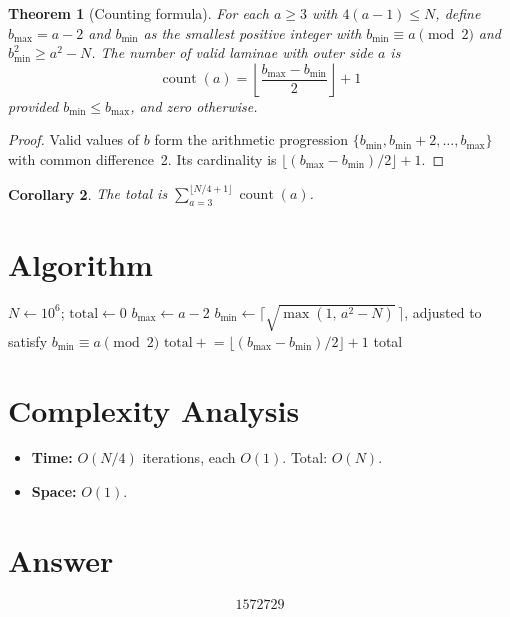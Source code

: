 \documentclass[11pt]{article}
\newtheorem{theorem}{Theorem}
\newtheorem{corollary}[theorem]{Corollary}
\begin{document}
\begin{theorem}[Counting formula]
For each $a \geq 3$ with $4(a{-}1) \leq N$, define $b_{\max} = a - 2$ and $b_{\min}$ as the smallest positive integer with $b_{\min} \equiv a \pmod{2}$ and $b_{\min}^2 \geq a^2 - N$. The number of valid laminae with outer side $a$ is
\[
\operatorname{count}(a) = \left\lfloor\frac{b_{\max} - b_{\min}}{2}\right\rfloor + 1
\]
provided $b_{\min} \leq b_{\max}$, and zero otherwise.
\end{theorem}

\begin{proof}
Valid values of $b$ form the arithmetic progression $\{b_{\min}, b_{\min}{+}2, \ldots, b_{\max}\}$ with common difference~2. Its cardinality is $\lfloor(b_{\max} - b_{\min})/2\rfloor + 1$.
\end{proof}

\begin{corollary}
The total is $\sum_{a=3}^{\lfloor N/4+1\rfloor}\operatorname{count}(a)$.
\end{corollary}

\section{Algorithm}

\begin{algorithmic}[1]
\State $N \gets 10^6$;\; $\text{total} \gets 0$
    \State $b_{\max} \gets a - 2$
    \State $b_{\min} \gets \lceil\sqrt{\max(1,\, a^2 - N)}\,\rceil$, adjusted to satisfy $b_{\min} \equiv a \pmod{2}$
        \State $\text{total} \mathrel{+}= \lfloor(b_{\max} - b_{\min})/2\rfloor + 1$
    \EndIf
\EndFor
\State \Return total
\end{algorithmic}

\section{Complexity Analysis}

\begin{itemize}
    \item \textbf{Time:} $O(N/4)$ iterations, each $O(1)$. Total: $O(N)$.
    \item \textbf{Space:} $O(1)$.
\end{itemize}

\section{Answer}

\[
\boxed{1572729}
\]
\end{document}

